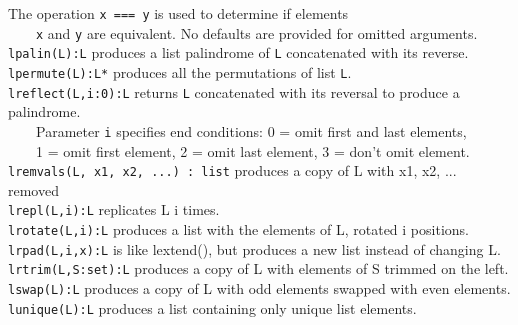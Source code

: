 The operation \texttt{x === y} is used to determine if elements\\
 \ \ \ \  \texttt{x} and \texttt{y} are equivalent.
No defaults are provided for omitted arguments. \\ %
\texttt{lpalin(L):L} produces a list palindrome of \texttt{L}
concatenated with its reverse.\\
\texttt{lpermute(L):L*} produces all the permutations of list
\texttt{L}.\\
\texttt{lreflect(L,i:0):L} returns \texttt{L} concatenated with its
reversal to produce a palindrome.\\
 \ \ \ \ Parameter \texttt{i} specifies
end conditions: 0 = omit first and last elements,\\
 \ \ \ \ 1 = omit first element, 2 = omit last element,
 3 = don't omit element.\\
\texttt{lremvals(L, x1, x2, ...) : list} produces a copy of L with
x1, x2, ... removed\\
\texttt{lrepl(L,i):L} replicates L i
times.\\
\texttt{lrotate(L,i):L} produces a list with the elements of L, rotated i
positions.\\
\texttt{lrpad(L,i,x):L} is like lextend(), but produces a new list instead of
changing L.\\
\texttt{lrtrim(L,S:set):L} produces a copy of L with elements of S trimmed on
 the left.\\
\texttt{lswap(L):L} produces a copy of L with odd elements swapped with even
elements.\\
\texttt{lunique(L):L} produces a list containing only unique list elements.

